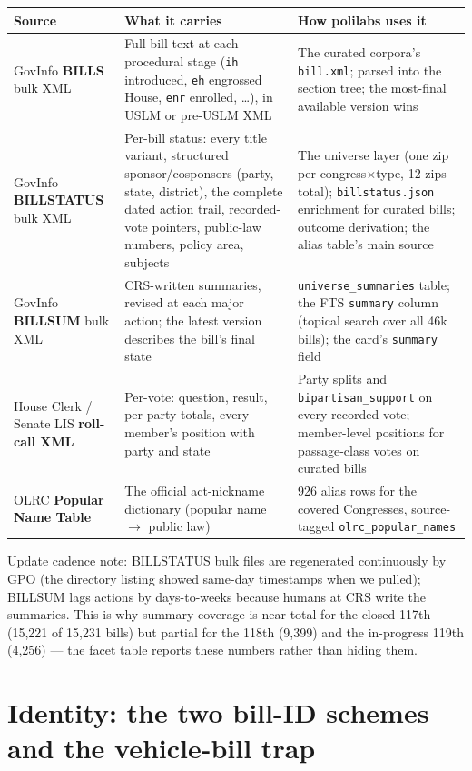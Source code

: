 \documentclass[11pt]{article}
\newcommand{\file}[1]{\texttt{#1}}
\newcommand{\code}[1]{\texttt{#1}}
\begin{document}
\begin{longtable}{@{}p{3.3cm}p{5.6cm}p{6.0cm}@{}}
\toprule
Source & What it carries & How polilabs uses it \\
\midrule
GovInfo \textbf{BILLS} bulk XML &
Full bill text at each procedural stage (\code{ih} introduced, \code{eh}
engrossed House, \code{enr} enrolled, \ldots), in USLM or pre-USLM XML &
The curated corpora's \file{bill.xml}; parsed into the section tree;
the most-final available version wins \\[3pt]
GovInfo \textbf{BILLSTATUS} bulk XML &
Per-bill status: every title variant, structured sponsor/cosponsors
(party, state, district), the complete dated action trail, recorded-vote
pointers, public-law numbers, policy area, subjects &
The universe layer (one zip per congress$\times$type, 12 zips total);
\file{billstatus.json} enrichment for curated bills; outcome derivation;
the alias table's main source \\[3pt]
GovInfo \textbf{BILLSUM} bulk XML &
CRS-written summaries, revised at each major action; the latest version
describes the bill's final state &
\code{universe\_summaries} table; the FTS \code{summary} column (topical
search over all 46k bills); the card's \code{summary} field \\[3pt]
House Clerk / Senate LIS \textbf{roll-call XML} &
Per-vote: question, result, per-party totals, every member's position
with party and state &
Party splits and \code{bipartisan\_support} on every recorded vote;
member-level positions for passage-class votes on curated bills \\[3pt]
OLRC \textbf{Popular Name Table} &
The official act-nickname dictionary (popular name $\to$ public law) &
926 alias rows for the covered Congresses, source-tagged
\code{olrc\_popular\_names} \\
\bottomrule
\end{longtable}

Update cadence note: BILLSTATUS bulk files are regenerated continuously by
GPO (the directory listing showed same-day timestamps when we pulled);
BILLSUM lags actions by days-to-weeks because humans at CRS write the
summaries. This is why summary coverage is near-total for the closed 117th
(15{,}221 of 15{,}231 bills) but partial for the 118th (9{,}399) and the
in-progress 119th (4{,}256) --- the facet table reports these numbers rather
than hiding them.

\section{Identity: the two bill-ID schemes and the vehicle-bill trap}
\label{sec:identity}
\end{document}

